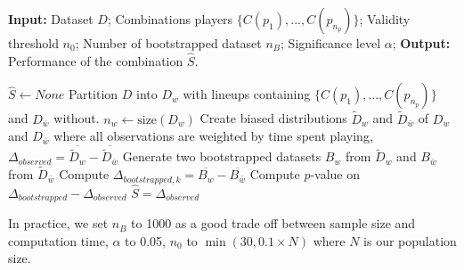 \begin{algorithm}
  \caption{Combination performance quantification}
  \footnotesize
  \label{alg:bootstrap}
  \begin{algorithmic}
  
    \Statex \textbf{Input:} Dataset $D$; 
    \Statex \hspace{3em} Combinations players $\{C(p_1), ... , C(p_{n_p}) \}$;
    \Statex \hspace{3em} Validity threshold $n_0$; 
    \Statex \hspace{3em} Number of bootstrapped dataset $n_B$;
    \Statex \hspace{3em} Significance level $\alpha$;
    \Statex \textbf{Output:} Performance of the combination $\hat{S}$.
  
  \State $\hat{S} \gets None $
  \State Partition $D$ into $D_w$ with lineups containing $\{C(p_1), ... , C(p_{n_p}) \}$ and $D_{\bar{w}}$ without.
  \State $n_w \gets \text{size}(D_w) $
    \State Create biased distributions $\tilde{D}_w$ and $\tilde{D}_{\bar{w}}$ of $D_w$ and $D_{\bar{w}}$ where all observations are weighted by time spent playing,
    \State $\Delta_{observed} = \overline{\tilde{D}_w} - \overline{\tilde{D}_{\bar{w}}}$
      \State Generate two bootstrapped datasets $B_w$ from $\tilde{D}_w$ and $B_{\bar{w}}$ from $\tilde{D}_{\bar{w}}$ 
      \State Compute $\Delta_{bootstrapped, k} = \overline{B_w} - \overline{B_{\bar{w}}}$ 
    \EndFor
    \State Compute $p$-value on $\Delta_{bootstrapped} - \Delta_{observed}$
      \State $\hat{S} = \Delta_{observed}$
    \EndIf
  \EndIf
  \end{algorithmic}
\end{algorithm}

In practice, we set $n_B$ to 1000 as a good trade off between sample size and computation time, $\alpha$ to 0.05, $n_0$ to $\min (30, 0.1 \times N)$ where $N$ is our population size.

